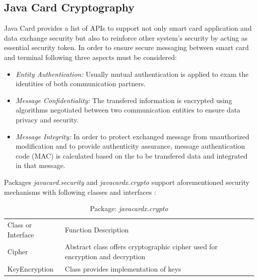 \subsection{Java Card Cryptography}
Java Card provides a list of APIs to support not only smart card application and data exchange security but also to reinforce other system's security by acting as essential security token. 
In order to ensure secure messaging between smart card and terminal following three aspects must be considered:
\begin{itemize}
\item \emph{Entity Authentication:} Usually mutual authentication is applied to exam the identities of both communication partners.
\item \emph{Message Confidentiality:} The transfered information is encrypted using algorithms negotiated between two communication entities to ensure data privacy and security.
\item \emph{Message Integrity:} In order to protect exchanged message from unauthorized modification and to provide authenticity assurance, message authentication code (MAC) is calculated based on the to be transfered data and integrated in that message.
\end{itemize}
Packages \emph{javacard.security} and \emph{javacardx.crypto} support aforementioned security mechanisms with following classes and interfaces \cite{chen}:

\begin{table}[!htbp]
\caption{Package: \emph{javacardx.crypto}}
\begin{tabular}{lllll}
\hline\hline
Class or Interface & Function Description\\[0.5ex]
Cipher & \parbox[t]{10cm}{Abstract class offers cryptographic cipher used for encryption and decryption}\\
KeyEncryption & Class provides implementation of keys\\
\hline
\end{tabular}
\label{table:javacardx-crypto}
\end{table}


